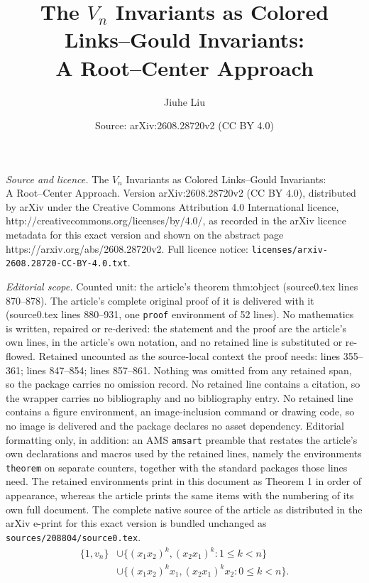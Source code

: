 \documentclass[10pt,a4paper]{amsart}
\title{The \(V_n\) Invariants as Colored Links--Gould Invariants:\\ A Root--Center Approach}
\author{Jiuhe Liu}
\date{Source: arXiv:2608.28720v2 (CC BY 4.0)}
\begin{document}
\maketitle

\noindent\emph{Source and licence.} The \(V_n\) Invariants as Colored Links--Gould Invariants:\\ A Root--Center Approach. Version arXiv:2608.28720v2 (CC BY 4.0), distributed by arXiv under the Creative Commons Attribution 4.0 International licence, http://creativecommons.org/licenses/by/4.0/, as recorded in the arXiv licence metadata for this exact version and shown on the abstract page https://arxiv.org/abs/2608.28720v2. Full licence notice: \texttt{licenses/arxiv-2608.28720-CC-BY-4.0.txt}.\par\smallskip

\noindent\textit{Editorial scope.} Counted unit: the article's theorem thm:object (source0.tex lines 870--878). The article's complete original proof of it is delivered with it (source0.tex lines 880--931, one \texttt{proof} environment of 52 lines). No mathematics is written, repaired or re-derived: the statement and the proof are the article's own lines, in the article's own notation, and no retained line is substituted or re-flowed.  Retained uncounted as the source-local context the proof needs: lines 355--361; lines 847--854; lines 857--861.  Nothing was omitted from any retained span, so the package carries no omission record.  No retained line contains a citation, so the wrapper carries no bibliography and no bibliography entry.  No retained line contains a figure environment, an image-inclusion command or drawing code, so no image is delivered and the package declares no asset dependency.  Editorial formatting only, in addition: an AMS \texttt{amsart} preamble that restates the article's own declarations and macros used by the retained lines, namely the environments \texttt{theorem} on separate counters, together with the standard packages those lines need.  The retained environments print in this document as Theorem 1 in order of appearance, whereas the article prints the same items with the numbering of its own full document.  The complete native source of the article as distributed in the arXiv e-print for this exact version is bundled unchanged as \texttt{sources/208804/source0.tex}.
\begin{equation}\label{eq:Yn-basis}
\begin{split}
 \{1,v_n\}
 &\cup\{(x_1x_2)^k,(x_2x_1)^k:1\leq k<n\}\\
 &\cup\{(x_1x_2)^kx_1,(x_2x_1)^kx_2:0\leq k<n\}.
\end{split}
\end{equation}
\end{document}
